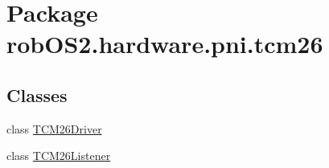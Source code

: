 \hypertarget{namespacerob_o_s2_1_1hardware_1_1pni_1_1tcm26}{
\section{Package robOS2.hardware.pni.tcm26}
\label{namespacerob_o_s2_1_1hardware_1_1pni_1_1tcm26}
}
\subsection*{Classes}
\begin{DoxyCompactItemize}
\item 
class \hyperlink{classrob_o_s2_1_1hardware_1_1pni_1_1tcm26_1_1_t_c_m26_driver}{TCM26Driver}
\item 
class \hyperlink{classrob_o_s2_1_1hardware_1_1pni_1_1tcm26_1_1_t_c_m26_listener}{TCM26Listener}
\end{DoxyCompactItemize}
